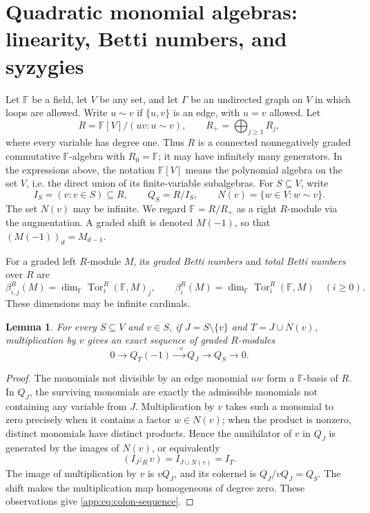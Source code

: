 \documentclass[11pt]{article}
\numberwithin{equation}{section}
\newtheorem{lemma}[theorem]{Lemma}
\theoremstyle{definition}
\theoremstyle{remark}
\newcommand{\Tor}{\operatorname{Tor}}
\begin{document}
\appendix
\section{Quadratic monomial algebras: linearity, Betti numbers, and syzygies}\label{app:sec:Quadratic monomial algebras and their quotients}
Let $\mathbb F$ be a field, let $V$ be any set, and let $\Gamma$ be an undirected graph on $V$ in which loops are allowed.  Write $u\sim v$ if $\{u,v\}$ is an edge, with $u=v$ allowed.  Let
\[
R=\mathbb F[V]/(uv:u\sim v),\qquad R_+=\bigoplus_{j\ge1}R_j,
\]
where every variable has degree one.  Thus $R$ is a connected nonnegatively graded commutative $\mathbb F$-algebra with $R_0=\mathbb F$; it may have infinitely many generators.  In the expressions above, the notation $\mathbb F[V]$ means the polynomial algebra on the set $V$, i.e. the direct union of its finite-variable subalgebras.  For $S\subseteq V$, write
\[
I_S=(v:v\in S)\subseteq R,\qquad Q_S=R/I_S,\qquad N(v)=\{w\in V:w\sim v\}.
\]
The set $N(v)$ may be infinite.  We regard $\mathbb F=R/R_+$ as a right $R$-module via the augmentation.  A graded shift is denoted $M(-1)$, so that $(M(-1))_d=M_{d-1}$.

For a graded left $R$-module $M$, its \emph{graded Betti numbers} and \emph{total Betti numbers} over $R$ are
\[
\beta_{i,j}^{R}(M)
 =\dim_{\mathbb F}\Tor_i^R(\mathbb F,M)_j,
\qquad
\beta_i^{R}(M)
 =\dim_{\mathbb F}\Tor_i^R(\mathbb F,M)
\quad(i\ge0).
\]
These dimensions may be infinite cardinals.

\begin{lemma}\label{app:lem:colon}
For every $S\subseteq V$ and $v\in S$, if $J=S\setminus\{v\}$ and $T=J\cup N(v)$, multiplication by $v$ gives an exact sequence of graded $R$-modules
\[
0\longrightarrow Q_T(-1)\xrightarrow{\ \cdot v\ }Q_J\longrightarrow Q_S\longrightarrow0.
\tag{1}\label{app:eq:colon-sequence}
\]
\end{lemma}
\begin{proof}
The monomials not divisible by an edge monomial $uw$ form a $\mathbb F$-basis of $R$.  In $Q_J$, the surviving monomials are exactly the admissible monomials not containing any variable from $J$.  Multiplication by $v$ takes such a monomial to zero precisely when it contains a factor $w\in N(v)$; when the product is nonzero, distinct monomials have distinct products.  Hence the annihilator of $v$ in $Q_J$ is generated by the images of $N(v)$, or equivalently
\[
(I_J:_R v)=I_{J\cup N(v)}=I_T.
\]
The image of multiplication by $v$ is $vQ_J$, and its cokernel is $Q_J/vQ_J=Q_S$.  The shift makes the multiplication map homogeneous of degree zero.  These observations give \eqref{app:eq:colon-sequence}.
\end{proof}
\end{document}
